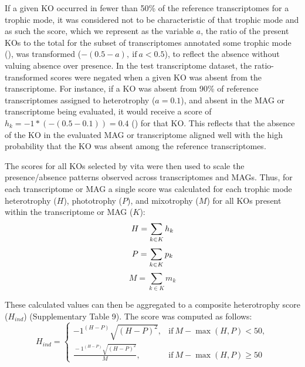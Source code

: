 \documentclass[12pt]{article}
\numberwithin{equation}{section}
\begin{document}
If a given KO occurred in fewer than 50\% of the reference transcriptomes for a trophic mode, it was considered not to be characteristic of that trophic mode and as such the score, which we represent as the variable $a$, the ratio of the present KOs to the total for the subset of transcriptomes annotated some trophic mode (), was transformed ($-(0.5 - a),\ \text{if} \ a<0.5$), to reflect the absence without valuing absence over presence. In the test transcriptome dataset, the ratio-transformed scores were negated when a given KO was absent from the transcriptome. For instance, if a KO was absent from 90\% of reference transcriptomes assigned to heterotrophy ($a = 0.1$), and absent in the MAG or transcriptome being evaluated, it would receive a score of $h_k = -1 * (-(0.5-0.1)) = 0.4$ () for that KO. This reflects that the absence of the KO in the evaluated MAG or transcriptome aligned well with the high probability that the KO was absent among the reference transcriptomes.

The scores for all KOs selected by vita were then used to scale the presence/absence patterns observed across transcriptomes and MAGs. Thus, for each transcriptome or MAG a single score was calculated for each trophic mode heterotrophy ($H$), phototrophy ($P$), and mixotrophy ($M$) for all KOs present within the transcriptome or MAG ($K$):
  \begin{equation}\label{eq:sum}
  H = \sum_{k \in K} h_k \\ 
  \end{equation}
  \begin{equation}
    P = \sum_{k \in K} p_k \\
\end{equation}
  \begin{equation}
    M = \sum_{k \in K} m_k
\end{equation}

These calculated values can then be aggregated to a composite heterotrophy score ($H_{ind}$) (Supplementary Table 9). The score was computed as follows: 
\begin{equation}\label{eq:hind}
  H_{ind}=
    \begin{cases}
      -1^{(H-P)}\sqrt{(H-P)^2}, & \text{if}\ M-\max(H,P)<50, \\
      \frac{{}-1^{(H-P)}\sqrt{(H-P)^2}}{M}, & \text{if} \ M-\max(H,P) \geq 50
    \end{cases}
  \end{equation}
  
\end{document}
